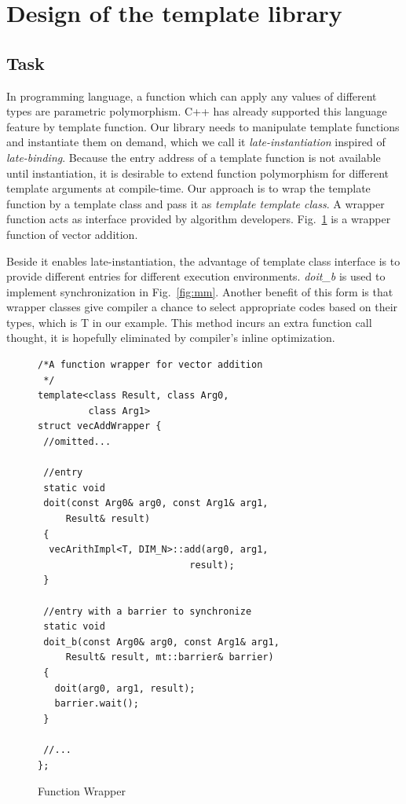 \section{Design of the template library}

\subsection{Task}
\label{section:interface}

In programming language, a function which can apply any values of
different types are parametric polymorphism. C++ has already supported
this language feature by template function. Our library needs to
manipulate template functions and instantiate them on demand, which we
call it \emph{late-instantiation} inspired of
\emph{late-binding}. Because the entry address of a template function is not available until instantiation, it is desirable to extend function
polymorphism for different template arguments  at compile-time. Our
approach is to wrap the template function by a template class and pass
it as \emph{template template class}. A wrapper function acts
as interface provided by algorithm developers. Fig.~\ref{lst:wrapper} is a wrapper function of vector addition. 

Beside it enables late-instantiation, the advantage of template class interface
is to provide different entries for different execution environments. \emph{doit\_b} is
used to implement synchronization in Fig.~\ref{fig:mm}.  Another benefit of
this form is that wrapper classes  give compiler a chance to select
appropriate codes based on their types, which is T in our example. This method incurs an extra function call  thought, it is hopefully  eliminated by
compiler's inline optimization.

\begin{figure}[!htp]
\begin{minipage}[tb]{\linewidth}
\makebox[\textwidth]{\hrulefill}
\begin{small}
\begin{verbatim}
/*A function wrapper for vector addition
 */
template<class Result, class Arg0, 
         class Arg1>
struct vecAddWrapper {
 //omitted...
 
 //entry
 static void 
 doit(const Arg0& arg0, const Arg1& arg1, 
     Result& result)
 {
  vecArithImpl<T, DIM_N>::add(arg0, arg1, 
                           result);
 }

 //entry with a barrier to synchronize
 static void 
 doit_b(const Arg0& arg0, const Arg1& arg1, 
     Result& result, mt::barrier& barrier)
 {
   doit(arg0, arg1, result);
   barrier.wait();
 }

 //...
};
\end{verbatim}
\end{small}
\makebox[\textwidth]{\hrulefill}
\end{minipage}
\caption{Function Wrapper}\label{lst:wrapper}
\end{figure}

